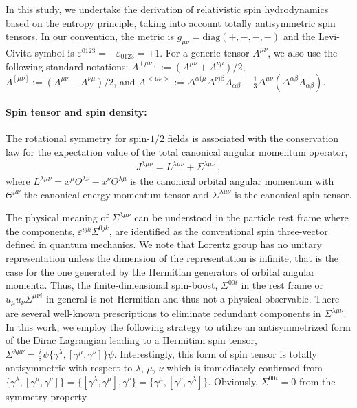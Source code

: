 \documentclass[prl,superscriptaddress,twocolumn,
  showpacs,preprintnumbers,amsmath,amssymb]{revtex4-1}
\begin{document}
In this study, we undertake the derivation of relativistic spin hydrodynamics based on the entropy principle, taking into account totally antisymmetric spin tensors.  In our convention, the metric is $g_{\mu\nu}=\mathrm{diag}(+,-,-,-)$ and the Levi-Civita symbol is $\varepsilon^{0123}=-\varepsilon_{0123}=+1$.  For a generic tensor $A^{\mu\nu}$, we also use the following standard notations:
$A^{(\mu\nu)}:=(A^{\mu\nu}+A^{\nu\mu})/2$,
$A^{[\mu\nu]}:=(A^{\mu\nu}-A^{\nu\mu})/2$,
and $A^{<\mu\nu>}:=\Delta^{\alpha(\mu}\Delta^{\nu)\beta}A_{\alpha\beta}-\frac{1}{3}\Delta^{\mu\nu}(\Delta^{\alpha\beta}A_{\alpha\beta})$.
\vspace{0.5em}


\paragraph*{Spin tensor and spin density:}

The rotational symmetry for spin-$1/2$ fields is associated with the conservation law for the expectation value of the total canonical angular momentum operator,
\begin{align}
  J^{\lambda\mu\nu} = L^{\lambda\mu\nu}+\Sigma^{\lambda\mu\nu}\,,
  \label{eq:J_TAM}
\end{align}
where $L^{\lambda\mu\nu}=x^{\mu}\Theta^{\lambda\nu}-x^{\nu}\Theta^{\lambda\mu}$ is the canonical orbital angular momentum with $\Theta^{\mu\nu}$ the canonical energy-momentum tensor and $\Sigma^{\lambda\mu\nu}$ is the canonical spin tensor.

The physical meaning of $\Sigma^{\lambda\mu\nu}$ can be understood in the particle rest frame where the components, $\varepsilon^{ijk}\Sigma^{0jk}$, are identified as the conventional spin three-vector defined in quantum mechanics.  We note that Lorentz group has no unitary representation unless the dimension of the representation is infinite, that is the case for the one generated by the Hermitian generators of orbital angular momenta.
Thus, the finite-dimensional spin-boost, $\Sigma^{00i}$ in the rest frame or $u_\mu u_\nu \Sigma^{\mu\nu i}$ in general is not Hermitian and thus not a physical observable.  There are several well-known prescriptions to eliminate redundant components in $\Sigma^{\lambda\mu\nu}$.
In this work, we employ the following strategy to utilize an antisymmetrized form of the Dirac Lagrangian leading to a Hermitian spin tensor, $\Sigma^{\lambda\mu\nu}=\frac{i}{8}\bar{\psi}\{\gamma^{\lambda},[\gamma^{\mu},\gamma^{\nu}]\}\psi$.  Interestingly,  this form of spin tensor is totally antisymmetric with respect to $\lambda$, $\mu$, $\nu$ which is immediately confirmed from $\{\gamma^\lambda,[\gamma^\mu,\gamma^\nu]\}=\{ [\gamma^\lambda,\gamma^\mu],\gamma^\nu\}=\{\gamma^\mu,[\gamma^\nu,\gamma^\lambda]\}$.
Obviously, $\Sigma^{00i}=0$ from the symmetry property.
\end{document}
